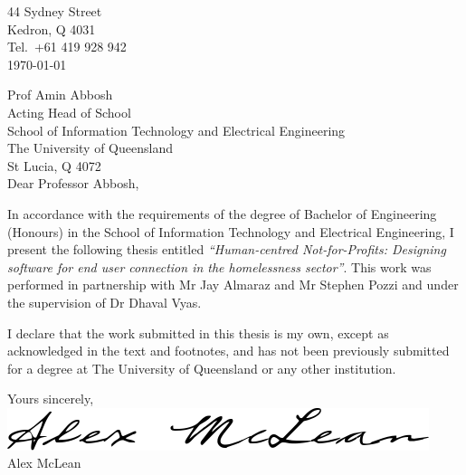 \begin{flushright}
    44 Sydney Street\\
    Kedron, Q 4031\\
    Tel.\ +61 419 928 942\\
    \medskip
    \today
\end{flushright}
\begin{flushleft}
    Prof Amin Abbosh\\
    Acting Head of School\\
    School of Information Technology and Electrical Engineering\\
    The University of Queensland\\
    St Lucia, Q 4072\\
    \bigskip\bigskip
    Dear Professor Abbosh,
\end{flushleft}

In accordance with the requirements of the degree of Bachelor of Engineering (Honours) in the School of Information Technology and Electrical Engineering, I present the following thesis entitled \emph{“Human-centred Not-for-Profits: Designing software for end user connection in the homelessness sector”}. This work was performed in partnership with Mr Jay Almaraz and Mr Stephen Pozzi and under the supervision of Dr Dhaval Vyas.

I declare that the work submitted in this thesis is my own, except as acknowledged in the text and footnotes, and has not been previously submitted for a degree at The University of Queensland or any other institution.

\begin{flushright}
    Yours sincerely,\\
    \medskip
    \includegraphics[scale=0.4]{assets/sig.png}\\
    \medskip
    Alex McLean
\end{flushright}

\cleardoublepage